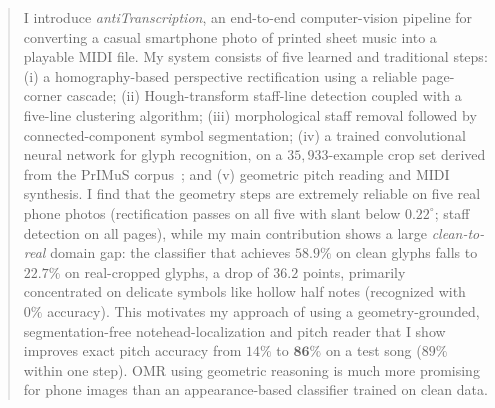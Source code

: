\begin{abstract}
I introduce \emph{antiTranscription}, an end-to-end computer-vision pipeline for
converting a casual smartphone photo of printed sheet music into a playable MIDI
file. My system consists of five learned and traditional steps: (i) a
homography-based perspective rectification using a reliable page-corner cascade;
(ii) Hough-transform staff-line detection coupled with a five-line clustering
algorithm; (iii) morphological staff removal followed by connected-component
symbol segmentation; (iv) a trained convolutional neural network for glyph
recognition, on a $35{,}933$-example crop set derived from the PrIMuS
corpus~\cite{calvo2018primus}; and (v) geometric pitch reading and MIDI
synthesis. I find that the geometry steps are extremely reliable on five real
phone photos (rectification passes on all five with slant below $0.22^{\circ}$;
staff detection on all pages), while my main contribution shows a large
\emph{clean-to-real} domain gap: the classifier that achieves $58.9\%$ on clean
glyphs falls to $22.7\%$ on real-cropped glyphs, a drop of $36.2$ points,
primarily concentrated on delicate symbols like hollow half notes (recognized
with $0\%$ accuracy). This motivates my approach of using a geometry-grounded,
segmentation-free notehead-localization and pitch reader that I show improves
exact pitch accuracy from $14\%$ to $\mathbf{86\%}$ on a test song ($89\%$ within
one step). OMR using geometric reasoning is much more promising for phone images
than an appearance-based classifier trained on clean data.
\end{abstract}
